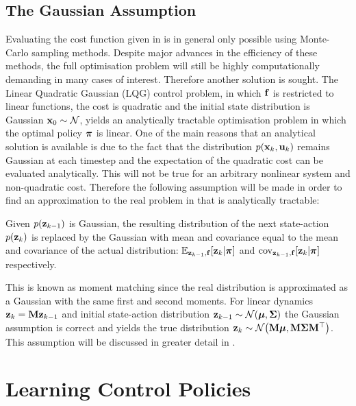 \subsection{The Gaussian Assumption}
Evaluating the cost function given in  is in general only possible using Monte-Carlo sampling methods. Despite major advances in the efficiency of these methods, the full optimisation problem will still be highly computationally demanding in many cases of interest. Therefore another solution is sought.
%
The Linear Quadratic Gaussian (LQG) control problem, in which $\mathbf{f}$ is restricted to linear functions, the cost is quadratic and the initial state distribution is Gaussian $\mathbf{x}_0 \sim \mathcal{N}$, yields an analytically tractable optimisation problem in which the optimal policy $\boldsymbol{\pi}$ is linear. One of the main reasons that an analytical solution is available is due to the fact that the distribution $p(\mathbf{x}_k,\mathbf{u}_k)$ remains Gaussian at each timestep and the expectation of the quadratic cost can be evaluated analytically. This will not be true for an arbitrary nonlinear system and non-quadratic cost. Therefore the following assumption will be made in order to find an approximation to the real problem in  that is analytically tractable:

\begin{ass} \label{ass:moment}
Given $p(\mathbf{z}_{k-1})$ is Gaussian, the resulting distribution of the next state-action $p(\mathbf{z}_{k})$ is replaced by the Gaussian with mean and covariance equal to the mean and covariance of the actual distribution: $\mathbb{E}_{\mathbf{z}_{k-1},\mathbf{f}}[\mathbf{z}_{k}|\boldsymbol{\pi}]$ and $\mathrm{cov}_{\mathbf{z}_{k-1},\mathbf{f}}[\mathbf{z}_{k}|\boldsymbol{\pi}]$ respectively. 
\end{ass}

This is known as moment matching since the real distribution is approximated as a Gaussian with the same first and second moments. For linear dynamics $\mathbf{z}_k = \mathbf{M}\mathbf{z}_{k-1}$ and initial state-action distribution $\mathbf{z}_{k-1} \sim \mathcal{N}(\boldsymbol{\mu},\boldsymbol{\Sigma})$ the Gaussian assumption is correct and yields the true distribution $\mathbf{z}_k \sim \mathcal{N} \big(\mathbf{M}\boldsymbol{\mu}, \mathbf{M} \boldsymbol{\Sigma} \mathbf{M}^\top\big)$. This assumption will be discussed in greater detail in .





\section{Learning Control Policies}

